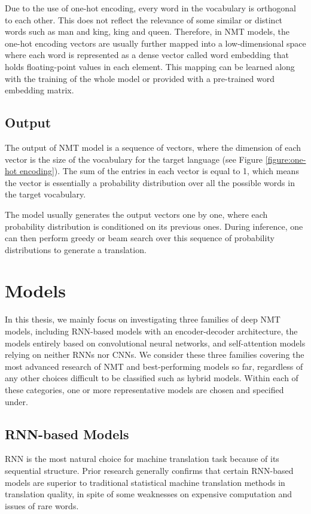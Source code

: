 Due to the use of one-hot encoding, every word in the vocabulary is orthogonal to each other. This does not reflect the relevance of some similar or distinct words such as man and king, king and queen. Therefore, in NMT models, the one-hot encoding vectors are usually further mapped into a low-dimensional space where each word is represented as a dense vector called word embedding that holds floating-point values in each element. This mapping can be learned along with the training of the whole model or provided with a pre-trained word embedding matrix.

\subsection{Output}

The output of NMT model is a sequence of vectors, where the dimension of each vector is the size of the vocabulary for the target language (see Figure \ref{figure:one-hot encoding}). The sum of the entries in each vector is equal to 1, which means the vector is essentially a probability distribution over all the possible words in the target vocabulary. 

The model usually generates the output vectors one by one, where each probability distribution is conditioned on its previous ones. During inference, one can then perform greedy or beam search over this sequence of probability distributions to generate a translation.


\section{Models}

In this thesis, we mainly focus on investigating three families of deep NMT models, including RNN-based models with an encoder-decoder architecture, the models entirely based on convolutional neural networks, and self-attention models relying on neither RNNs nor CNNs. We consider these three families covering the most advanced research of NMT and best-performing models so far, regardless of any other choices difficult to be classified such as hybrid models. Within each of these categories, one or more representative models are chosen and specified under.

\subsection{RNN-based Models}

RNN is the most natural choice for machine translation task because of its sequential structure. Prior research generally confirms that certain RNN-based models are superior to traditional statistical machine translation methods in translation quality, in spite of some weaknesses on expensive computation and issues of rare words. 

